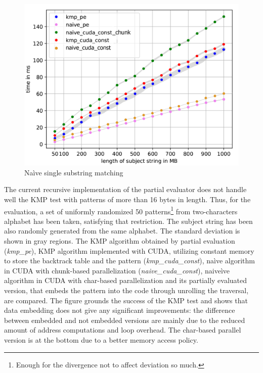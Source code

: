 \begin{figure}
    \centering
    \includegraphics{figures/KMP_TEST.png}
    \caption{Na\`ive single substring matching}
    \label{fig:kmp_test}
\end{figure}

The current recursive implementation of the partial evaluator does not handle well the KMP test with patterns of more than 16 bytes in length. Thus, for the evaluation, a set of uniformly randomized 50 patterns\footnote{Enough for the divergence not to affect deviation so much.} from two-characters alphabet has been taken, satisfying that restriction. The subject string has been also randomly generated from the same alphabet. The standard deviation is shown in gray regions.
The KMP algorithm obtained by partial evaluation (\emph{kmp\_pe}), KMP algorithm implemented with CUDA, utilizing constant memory to store the backtrack table and the pattern (\emph{kmp\_cuda\_const}), na\`ive algorithm in CUDA with chunk-based parallelization (\emph{naive\_cuda\_const}), naive\`ive algorithm in CUDA with char-based parallelization and its partially evaluated version, that embeds the pattern into the code through unrolling the traversal, are compared. The figure grounds the success of the KMP test and shows that data embedding does not give any significant improvements: the difference between embedded and not embedded versions are mainly due to the reduced amount of address computations and loop overhead. The char-based parallel version is at the bottom due to a better memory access policy.

